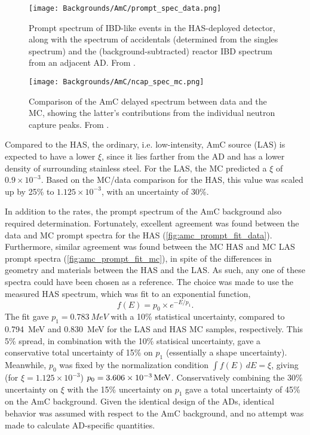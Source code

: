 \documentclass[../thesis.tex]{subfiles}
\begin{document}
\begin{figure}[ht]
  \texttt{[image: Backgrounds/AmC/prompt\_spec\_data.png]}
  \caption{Prompt spectrum of IBD-like events in the HAS-deployed detector, along with the spectrum of accidentals (determined from the singles spectrum) and the (background-subtracted) reactor IBD spectrum from an adjacent AD. From \cite{Gu_2016}.}
  \label{fig:amc_prompt_spec_data}
\end{figure}

\begin{figure}[ht]
  \texttt{[image: Backgrounds/AmC/ncap\_spec\_mc.png]}
  \caption{Comparison of the AmC delayed spectrum between data and the MC, showing the latter's contributions from the individual neutron capture peaks. From \cite{Gu_2016}.}
  \label{fig:amc_ncap_spec_mc}
\end{figure}

Compared to the HAS, the ordinary, i.e. low-intensity, AmC source (LAS) is expected to have a lower $\xi$, since it lies farther from the AD and has a lower density of surrounding stainless steel. For the LAS, the MC predicted a $\xi$ of $0.9\times10^{-3}$. Based on the MC/data comparison for the HAS, this value was scaled up by 25\% to $1.125\times10^{-3}$, with an uncertainty of 30\%. 

In addition to the rates, the prompt spectrum of the AmC background also required determination. Fortunately, excellent agreement was found between the data and MC prompt spectra for the HAS (\autoref{fig:amc_prompt_fit_data}). Furthermore, similar agreement was found between the MC HAS and MC LAS prompt spectra (\autoref{fig:amc_prompt_fit_mc}), in spite of the differences in geometry and materials between the HAS and the LAS. As such, any one of these spectra could have been chosen as a reference. The choice was made to use the measured HAS spectrum, which was fit to an exponential function,
\begin{equation}
  f(E) = p_0 \times e^{-E/p_1}.
  \label{eq:amc_fit_func}
\end{equation}
The fit gave $p_1 = \SI{0.783}{MeV}$ with a 10\% statistical uncertainty, compared to \SI{0.794}{MeV} and \SI{0.830}{MeV} for the LAS and HAS MC samples, respectively. This 5\% spread, in combination with the 10\% statisical uncertainty, gave a conservative total uncertainty of 15\% on $p_1$ (essentially a shape uncertainty). Meanwhile, $p_0$ was fixed by the normalization condition $\int f(E)\,dE = \xi$, giving (for $\xi = 1.125\times10^{-3}$) $p_0 = \SI[parse-numbers = false]{3.606\times10^{-3}}{/MeV}$. Conservatively combining the 30\% uncertainty on $\xi$ with the 15\% uncertainty on $p_1$ gave a total uncertainty of 45\% on the AmC background. Given the identical design of the ADs, identical behavior was assumed with respect to the AmC background, and no attempt was made to calculate AD-specific quantities.
\end{document}
